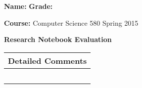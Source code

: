 \documentclass[letterpaper, 10pt]{article} %
\begin{document}
\pagestyle{empty}

\vspace*{-1.2in}

\noindent
{\bf Name:} \hspace*{4.8in} {\bf Grade:} 

\vspace*{.1in}

\noindent
{\bf Course:} Computer Science 580 Spring 2015

\vspace*{.1in}



\large{

\begin{center}{\bf Research Notebook Evaluation} \end{center}

\begin{tabular}{l}

\begin{minipage}{6in} \hspace*{-.25in} {\bf Detailed Comments} \vspace*{.25in} \end{minipage} \\ \hline

\begin{minipage}{6in} \vspace*{.25in} \end{minipage} \\ \hline

\begin{minipage}{6in} \vspace*{.25in} \end{minipage} \\ \hline

\begin{minipage}{6in} \vspace*{.25in} \end{minipage} \\ \hline

\begin{minipage}{6in} \vspace*{.25in} \end{minipage} \\ \hline

\begin{minipage}{6in} \vspace*{.25in} \end{minipage} \\ \hline


\end{tabular}}
\end{document}
